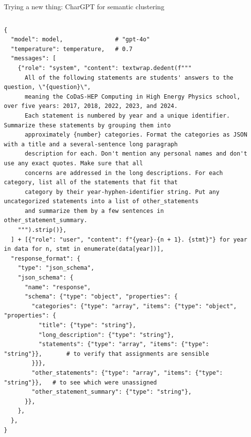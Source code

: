 \documentclass[aspectratio=169]{beamer}
\begin{document}
\begin{frame}[fragile]{Trying a new thing: CharGPT for semantic clustering}
\tiny
\vspace{0.25 cm}
\begin{columns}
\begin{verbatim}
{
  "model": model,               # "gpt-4o"
  "temperature": temperature,   # 0.7
  "messages": [
    {"role": "system", "content": textwrap.dedent(f"""
      All of the following statements are students' answers to the question, \"{question}\",
      meaning the CoDaS-HEP Computing in High Energy Physics school, over five years: 2017, 2018, 2022, 2023, and 2024.
      Each statement is numbered by year and a unique identifier. Summarize these statements by grouping them into
      approximately {number} categories. Format the categories as JSON with a title and a several-sentence long paragraph
      description for each. Don't mention any personal names and don't use any exact quotes. Make sure that all
      concerns are addressed in the long descriptions. For each category, list all of the statements that fit that
      category by their year-hyphen-identifier string. Put any uncategorized statements into a list of other_statements
      and summarize them by a few sentences in other_statement_summary.
    """).strip()},
  ] + [{"role": "user", "content": f"{year}-{n + 1}. {stmt}"} for year in data for n, stmt in enumerate(data[year])],
  "response_format": {
    "type": "json_schema",
    "json_schema": {
      "name": "response",
      "schema": {"type": "object", "properties": {
        "categories": {"type": "array", "items": {"type": "object", "properties": {
          "title": {"type": "string"},
          "long_description": {"type": "string"},
          "statements": {"type": "array", "items": {"type": "string"}},       # to verify that assignments are sensible
        }}},
        "other_statements": {"type": "array", "items": {"type": "string"}},   # to see which were unassigned
        "other_statement_summary": {"type": "string"},
      }},
    },
  },
}
\end{verbatim}
\end{columns}
\end{frame}
\end{document}
